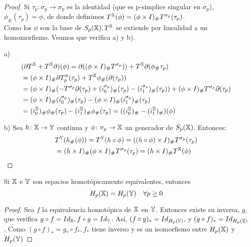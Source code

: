 \begin{proof}
  Si $\tau_p \colon \sigma_p \to \sigma_p$ es la identidad (que es p-símplice singular en $\sigma_p$), $\phi_\#(\tau_p) = \phi$,
  de donde definimos $T^{\mathbb X}(\phi) = (\phi \times I)_\# T^{\sigma_p}(\tau_p)$. \\
  Como los $\phi$ son la base de $S_{p}({\mathbb X}), T^{\mathbb X}$ se extiende por linealidad a un homomorfismo. Veamos que verifica a) y b).

  a)
  \begin{align*}
    &(\partial T^{\mathbb X} + T^{\mathbb X} \partial)(\phi) = \partial((\phi \times I)_\# T^{\sigma_p})) + T^{\mathbb X} \partial(\phi_\# \tau_p) \\
    &= (\phi \times I)_\# \partial T^\sigma_p(\tau_p) + T^{\mathbb X} \phi_\#(\partial(\tau_p)) \\
    &= (\phi \times I)_\# (- T^{\sigma_p} \partial(\tau_p) + (i_0^{\sigma_p})_\# (\tau_p) - (i_1^{\sigma_p})_\# (\tau_p)) + (\phi \times I)_\# T^{\sigma_p}\partial(\tau_p) \\
    &= (\phi \times I)_\# (i_0^{\sigma_p})_\#(\tau_p) - (\phi \times I)_\# (i_1^{\sigma_p})_\#(\tau_p) \\
    &= (i_0^{\mathbb X})_\# \phi_\#(\tau_p) - (i_1^{\mathbb X})_\# \phi_\#(\tau_p) = ((i_0^{\mathbb X})_\# - (i_1^{\mathbb X})_\#) (\phi)
  \end{align*}

  b) Sea $h\colon {\mathbb X} \to {\mathbb Y}$ continua y $\phi \colon \sigma_p \to {\mathbb X}$ un generador de $S_{p}({\mathbb X})$. Entonces:
  \begin{align*}
    &T^{\mathbb Y}(h_\#(\phi)) = T^{\mathbb Y}(h \circ \phi) = ((h \circ \phi) \times I)_\# T^{\sigma_p}(\tau_p) \\
    &= (h \times I)_\# (\phi \times I)_\# T^{\sigma_p} (\tau_p) = (h \times I)_\# T^{\mathbb X}(\phi)
  \end{align*}
\end{proof}

\begin{corollary}
  Si ${\mathbb X}$ e ${\mathbb Y}$ son espacios homotópicamente equivalentes, entonces \[H_p({\mathbb X}) = H_p({\mathbb Y}) \quad \forall p \geq 0\]
\end{corollary}

\begin{proof}
  Sea $f$ la equivalencia homotópica de ${\mathbb X}$ en ${\mathbb Y}$. Entonces existe su inversa, $g$, que verifica $g \circ f = Id_{\mathbb X}, f \circ g = Id_{\mathbb Y}$.
  Así, $(f \circ g)_* = Id_{H_p({\mathbb Y})},$ y $(g \circ f)_* = Id_{H_p({\mathbb X})}$. Como $(g \circ f)_* = g_* \circ f_*, f_*$ tiene inverso y es un isomorfismo
  entre $H_p({\mathbb X})$ y $H_p({\mathbb Y})$
\end{proof}

